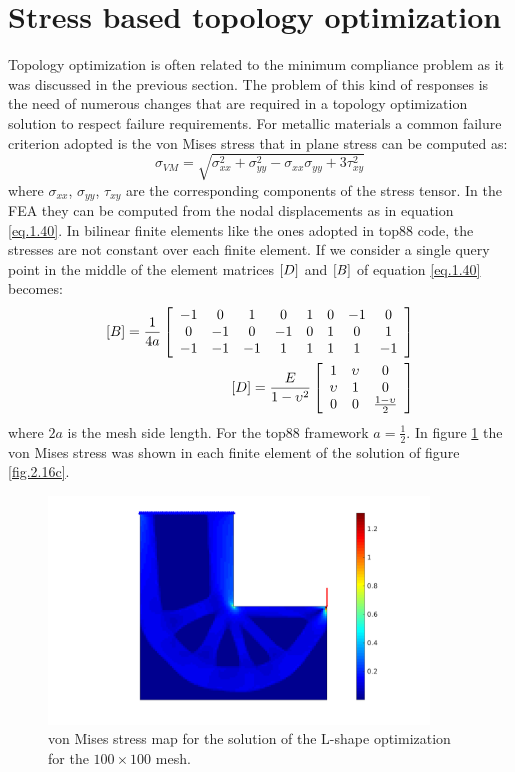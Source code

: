 \section{Stress based topology optimization}
\label{Sec2.3}
Topology optimization is often related to the minimum compliance problem as it was discussed in the previous section. The problem of this kind of responses is the need of numerous changes that are required in a topology optimization solution to respect failure requirements. For metallic materials a common failure criterion adopted is the von Mises stress that in plane stress can be computed as:
\begin{equation}
\sigma_{VM}=\sqrt{\sigma_{xx}^2+\sigma_{yy}^2-\sigma_{xx}\sigma_{yy}+3\tau_{xy}^2}
\end{equation}
where $\sigma_{xx}$, $\sigma_{yy}$, $\tau_{xy}$ are the corresponding components of the stress tensor. In the FEA they can be computed from the nodal displacements as in equation \eqref{eq.1.40}. In bilinear finite elements like the ones adopted in top88 code, the stresses are not constant over each finite element. If we consider a single query point in the middle of the element matrices $\left[{D}\right]$ and $\left[{B}\right]$ of equation \eqref{eq.1.40} becomes:
\begin{eqnarray}
\left[{B}\right]=\frac{1}{4a}\left[{\begin{array}{cccccccc}
-1 & 0 & 1 & 0 & 1 & 0 & -1 & 0\\
0 & -1 & 0 & -1 & 0 & 1 & 0 & 1\\
-1 & -1 & -1 & 1 & 1 & 1 & 1 & -1
\end{array}}\right]\\
\left[{D}\right]=\frac{E}{1-\upsilon^2}\left[{\begin{array}{ccc}
1 & \upsilon & 0 \\
\upsilon & 1 & 0 \\
0 & 0 & \frac{1-\upsilon}{2}
\end{array}}\right]
\end{eqnarray}
where $2a$ is the mesh side length. For the top88 framework $a=\frac{1}{2}$.  
In figure \ref{fig.2.17} the von Mises stress was shown in each finite element of the solution of figure \ref{fig.2.16c}. 
\begin{figure}[ht]
\centering
\includegraphics[width=0.9\textwidth]{images/Ch2/L-shapenelx_100nely_100_R_8_volfrac_40_ft_3VM_stress}
\caption{von Mises stress map for the solution of the L-shape optimization for the $100\times100$ mesh.}
\label{fig.2.17}
\end{figure}
